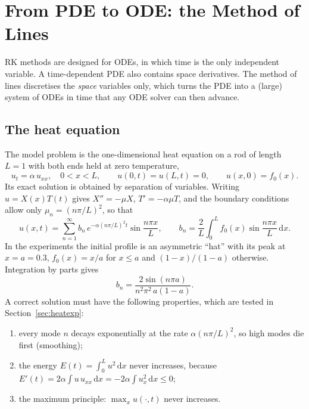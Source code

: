 \documentclass[11pt,a4paper]{article}
\newcommand{\dd}{\mathrm{d}}
\begin{document}
\section{From PDE to ODE: the Method of Lines}\label{sec:mol}

RK methods are designed for ODEs, in which time is the only independent variable. A time-dependent PDE
also contains space derivatives. The method of lines discretises the \emph{space} variables only, which
turns the PDE into a (large) system of ODEs in time that any ODE solver can then advance.

\subsection{The heat equation}

The model problem is the one-dimensional heat equation on a rod of length $L=1$ with both ends held at
zero temperature,
\begin{equation}
u_t=\alpha\,u_{xx},\quad 0<x<L,\qquad u(0,t)=u(L,t)=0,\qquad u(x,0)=f_0(x).
\end{equation}
Its exact solution is obtained by separation of variables. Writing $u=X(x)T(t)$ gives
$X''=-\mu X$, $T'=-\alpha\mu T$, and the boundary conditions allow only $\mu_n=(n\pi/L)^2$, so that
\begin{equation}
u(x,t)=\sum_{n=1}^{\infty}b_n\,e^{-\alpha(n\pi/L)^2t}\sin\frac{n\pi x}{L},\qquad
b_n=\frac2L\int_0^Lf_0(x)\sin\frac{n\pi x}{L}\,\dd x.
\label{eq:heatexact}
\end{equation}
In the experiments the initial profile is an asymmetric ``hat'' with its peak at $x=a=0.3$,
$f_0(x)=x/a$ for $x\le a$ and $(1-x)/(1-a)$ otherwise. Integration by parts gives
\begin{equation}
b_n=\frac{2\sin(n\pi a)}{n^2\pi^2\,a(1-a)} .
\end{equation}
A correct solution must have the following properties, which are tested in Section~\ref{sec:heatexp}:
\begin{enumerate}[leftmargin=*]
\item every mode $n$ decays exponentially at the rate $\alpha(n\pi/L)^2$, so high modes die first (smoothing);
\item the energy $E(t)=\int_0^Lu^2\,\dd x$ never increases, because
$E'(t)=2\alpha\int u\,u_{xx}\,\dd x=-2\alpha\int u_x^2\,\dd x\le0$;
\item the maximum principle: $\max_x u(\cdot,t)$ never increases.
\end{enumerate}
\end{document}
